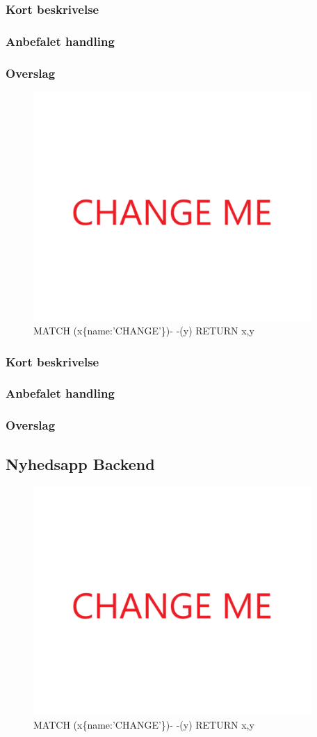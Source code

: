 \documentclass{article}
\begin{document}
\subsubsection{Kort beskrivelse}
\subsubsection{Anbefalet handling}
\subsubsection{Overslag}
\begin{figure}[h]
\includegraphics[width=300pt]{CHANGE.PNG}
\caption{MATCH (x\{name:'CHANGE'\})- -(y) RETURN x,y}
\end{figure}
\subsubsection{Kort beskrivelse}
\subsubsection{Anbefalet handling}
\subsubsection{Overslag}
\subsection{Nyhedsapp Backend}
\begin{figure}[h]
\includegraphics[width=300pt]{CHANGE.PNG}
\caption{MATCH (x\{name:'CHANGE'\})- -(y) RETURN x,y}
\end{figure}
\end{document}
